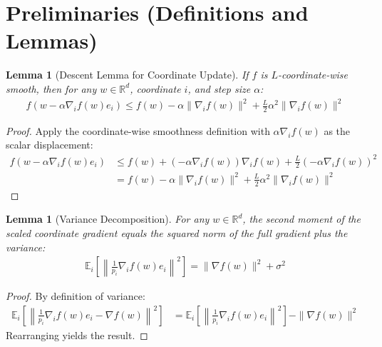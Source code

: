 \documentclass{article}
\newtheorem{lemma}[theorem]{Lemma}
\begin{document}
\section*{Preliminaries (Definitions and Lemmas)}
\begin{lemma}[Descent Lemma for Coordinate Update]
If $f$ is $L$-coordinate-wise smooth, then for any $w \in \mathbb{R}^d$, coordinate $i$, and step size $\alpha$:
\begin{align*}
    f(w - \alpha \nabla_i f(w) e_i) \leq f(w) - \alpha \|\nabla_i f(w)\|^2 + \frac{L}{2} \alpha^2 \|\nabla_i f(w)\|^2
\end{align*}
\end{lemma}
\begin{proof}
Apply the coordinate-wise smoothness definition with $\alpha \nabla_i f(w)$ as the scalar displacement:
\begin{align*}
    f(w - \alpha \nabla_i f(w) e_i) &\leq f(w) + (-\alpha \nabla_i f(w)) \nabla_i f(w) + \frac{L}{2} (-\alpha \nabla_i f(w))^2 \\
    &= f(w) - \alpha \|\nabla_i f(w)\|^2 + \frac{L}{2} \alpha^2 \|\nabla_i f(w)\|^2
\end{align*}
\end{proof}

\begin{lemma}[Variance Decomposition]
For any $w \in \mathbb{R}^d$, the second moment of the scaled coordinate gradient equals the squared norm of the full gradient plus the variance:
\begin{align*}
    \mathbb{E}_{i} \left[ \left\| \frac{1}{p_i} \nabla_i f(w) e_i \right\|^2 \right] = \|\nabla f(w)\|^2 + \sigma^2
\end{align*}
\end{lemma}
\begin{proof}
By definition of variance:
\begin{align*}
    \mathbb{E}_{i} \left[ \left\| \frac{1}{p_i} \nabla_i f(w) e_i - \nabla f(w) \right\|^2 \right] &= \mathbb{E}_{i} \left[ \left\| \frac{1}{p_i} \nabla_i f(w) e_i \right\|^2 \right] - \|\nabla f(w)\|^2
\end{align*}
Rearranging yields the result.
\end{proof}
\end{document}
